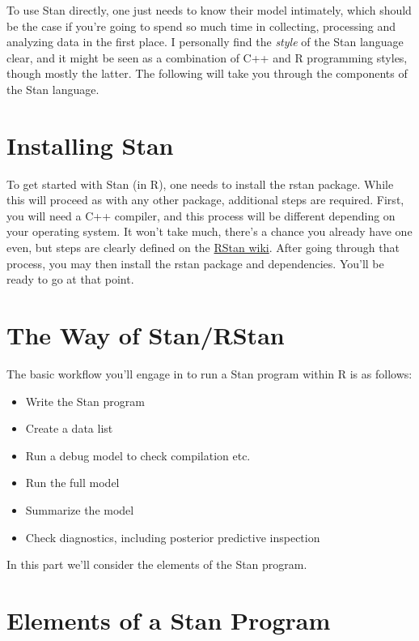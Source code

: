 \documentclass[]{book}
\providecommand{\tightlist}{%
  \setlength{\itemsep}{0pt}\setlength{\parskip}{0pt}}
\begin{document}
To use Stan directly, one just needs to know their model intimately,
which should be the case if you're going to spend so much time in
collecting, processing and analyzing data in the first place. I
personally find the \emph{style} of the Stan language clear, and it
might be seen as a combination of C++ and R programming styles, though
mostly the latter. The following will take you through the components of
the Stan language.

\section{Installing Stan}\label{installing-stan}

To get started with Stan (in R), one needs to install the {rstan}
package. While this will proceed as with any other package, additional
steps are required. First, you will need a C++ compiler, and this
process will be different depending on your operating system. It won't
take much, there's a chance you already have one even, but steps are
clearly defined on the
\href{https://github.com/stan-dev/rstan/wiki/RStan-Getting-Started}{RStan
wiki}. After going through that process, you may then install the
{rstan} package and dependencies. You'll be ready to go at that point.

\section{The Way of Stan/RStan}\label{the-way-of-stanrstan}

The basic workflow you'll engage in to run a Stan program within R is as
follows:

\begin{itemize}
\tightlist
\item
  Write the Stan program
\item
  Create a data list
\item
  Run a debug model to check compilation etc.
\item
  Run the full model
\item
  Summarize the model
\item
  Check diagnostics, including posterior predictive inspection
\end{itemize}

In this part we'll consider the elements of the Stan program.

\section{Elements of a Stan Program}\label{elements-of-a-stan-program}
\end{document}
